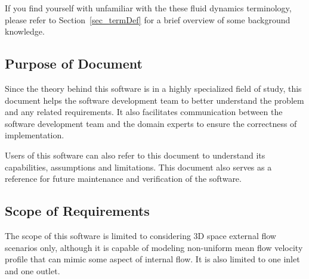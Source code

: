 \documentclass[12pt]{article}
\begin{document}
If you find yourself with unfamiliar with the these fluid dynamics terminology, please refer to Section~\ref{sec_termDef} for a brief overview of some background knowledge.

\subsection{Purpose of Document}
Since the theory behind this software is in a highly specialized field of study, this document helps the software development team to better understand the problem and any related requirements. It also facilitates communication between the software development team and the domain experts to ensure the correctness of implementation.

Users of this software can also refer to this document to understand its capabilities, assumptions and limitations. This document also serves as a reference for future maintenance and verification of the software.


\subsection{Scope of Requirements} 

The scope of this software is limited to considering 3D space external flow scenarios only, although it is capable of modeling non-uniform mean flow velocity profile that can mimic some aspect of internal flow. It is also limited to one inlet and one outlet.
\end{document}
